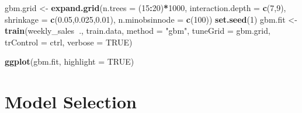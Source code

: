 \documentclass[]{article}
\newenvironment{Shaded}{\begin{snugshade}}{\end{snugshade}}
\newcommand{\DataTypeTok}[1]{\textcolor[rgb]{0.13,0.29,0.53}{#1}}
\newcommand{\DecValTok}[1]{\textcolor[rgb]{0.00,0.00,0.81}{#1}}
\newcommand{\FloatTok}[1]{\textcolor[rgb]{0.00,0.00,0.81}{#1}}
\newcommand{\KeywordTok}[1]{\textcolor[rgb]{0.13,0.29,0.53}{\textbf{#1}}}
\newcommand{\NormalTok}[1]{#1}
\newcommand{\OperatorTok}[1]{\textcolor[rgb]{0.81,0.36,0.00}{\textbf{#1}}}
\newcommand{\OtherTok}[1]{\textcolor[rgb]{0.56,0.35,0.01}{#1}}
\newcommand{\StringTok}[1]{\textcolor[rgb]{0.31,0.60,0.02}{#1}}
\begin{document}
\begin{Shaded}
\begin{Highlighting}[]
\NormalTok{gbm.grid <-}\StringTok{ }\KeywordTok{expand.grid}\NormalTok{(}\DataTypeTok{n.trees =}\NormalTok{ (}\DecValTok{15}\OperatorTok{:}\DecValTok{20}\NormalTok{)}\OperatorTok{*}\DecValTok{1000}\NormalTok{,}
                        \DataTypeTok{interaction.depth =} \KeywordTok{c}\NormalTok{(}\DecValTok{7}\NormalTok{,}\DecValTok{9}\NormalTok{),}
                        \DataTypeTok{shrinkage =} \KeywordTok{c}\NormalTok{(}\FloatTok{0.05}\NormalTok{,}\FloatTok{0.025}\NormalTok{,}\FloatTok{0.01}\NormalTok{),}
                        \DataTypeTok{n.minobsinnode =} \KeywordTok{c}\NormalTok{(}\DecValTok{100}\NormalTok{))}
\KeywordTok{set.seed}\NormalTok{(}\DecValTok{1}\NormalTok{)}
\NormalTok{gbm.fit <-}\StringTok{ }\KeywordTok{train}\NormalTok{(weekly_sales}\OperatorTok{~}\NormalTok{., train.data,}
                 \DataTypeTok{method =} \StringTok{"gbm"}\NormalTok{,}
                 \DataTypeTok{tuneGrid =}\NormalTok{ gbm.grid,}
                 \DataTypeTok{trControl =}\NormalTok{ ctrl,}
                 \DataTypeTok{verbose =} \OtherTok{TRUE}\NormalTok{)}

\KeywordTok{ggplot}\NormalTok{(gbm.fit, }\DataTypeTok{highlight =} \OtherTok{TRUE}\NormalTok{)}
\end{Highlighting}
\end{Shaded}

\begin{Shaded}
\end{Shaded}

\hypertarget{model-selection}{%
\section{Model Selection}\label{model-selection}}
\end{document}
